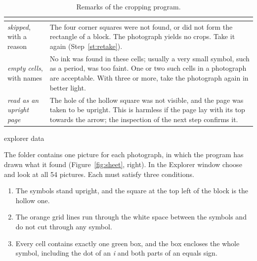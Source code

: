 \begin{table}[H]
\centering
\begin{tabular}{L{3.6cm}L{7.6cm}}
\toprule
{} &  \\
\midrule
\emph{skipped}, with a reason & The four corner squares were not found, or did not form the
  rectangle of a block. The photograph yields no crops. Take it again (Step~\ref{st:retake}). \\
\emph{empty cells}, with names & No ink was found in these cells; usually a very small symbol,
  such as a period, was too faint. One or two such cells in a photograph are acceptable. With
  three or more, take the photograph again in better light. \\
\emph{read as an upright page} & The hole of the hollow square was not visible, and the page was
  taken to be upright. This is harmless if the page lay with its top towards the arrow; the
  inspection of the next step confirms it. \\
\bottomrule
\end{tabular}
\caption{Remarks of the cropping program.}
\label{tab:cropnotes}
\end{table}

\label{st:debug}
\begin{ps}
explorer data\sheets\debug
\end{ps}
The folder contains one picture for each photograph, in which the program has drawn what it
found (Figure~\ref{fig:sheet}, right). In the Explorer window choose
\then{} and look at all 54 pictures. Each must satisfy three
conditions.
\begin{enumerate}
\item The symbols stand upright, and the square at the top left of the block is the hollow one.
\item The orange grid lines run through the white space between the symbols and do not cut
  through any symbol.
\item Every cell contains exactly one green box, and the box encloses the whole symbol,
  including the dot of an \emph{i} and both parts of an equals sign.
\end{enumerate}

